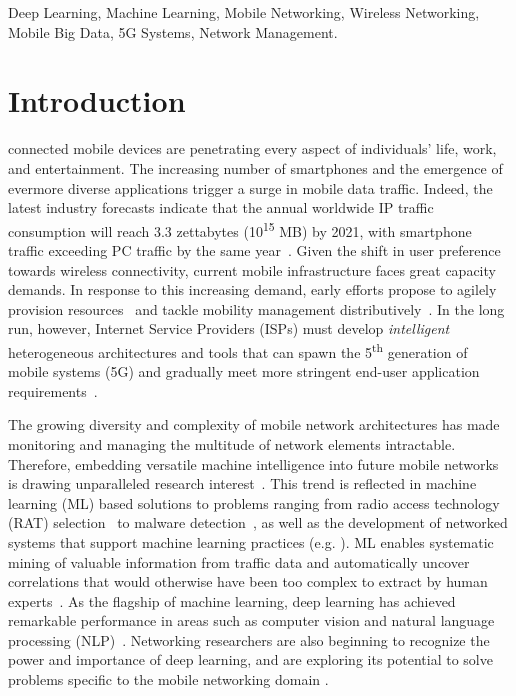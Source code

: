\documentclass[journal,comsoc,letter]{IEEEtran}
\begin{document}
\begin{IEEEkeywords}
Deep Learning, Machine Learning, Mobile Networking, Wireless Networking, Mobile Big Data, 5G Systems, Network Management.
\end{IEEEkeywords}

\IEEEpeerreviewmaketitle

\section{Introduction}
 connected mobile devices are penetrating every aspect of individuals' life, work, and entertainment. The increasing number of smartphones and the emergence of evermore diverse applications trigger a surge in mobile data traffic. Indeed, the latest industry forecasts indicate that the annual worldwide IP traffic consumption will reach 3.3 zettabytes (10\textsuperscript{15} MB) by 2021, with smartphone traffic exceeding PC traffic by the same year~\cite{cisco2017}. Given the shift in user preference towards wireless connectivity, current mobile infrastructure faces great capacity demands. In response to this increasing demand, early efforts propose to agilely provision resources~\cite{wang2015backhauling} and tackle mobility management distributively~\cite{giust2015distributed}. In the long run, however, Internet Service Providers (ISPs) must develop \emph{intelligent} heterogeneous architectures and tools that can spawn the 5\textsuperscript{th} generation of mobile systems (5G) and gradually meet more stringent end-user application requirements~\cite{agiwal2016next, gupta2015survey}. 

The growing diversity and complexity of mobile network architectures has made monitoring and managing the multitude of network elements intractable. Therefore, embedding versatile machine intelligence into future mobile networks is drawing unparalleled research interest~\cite{zheng2016big, jiang2017machine}. This trend is reflected in machine learning (ML) based solutions to problems ranging from radio access technology (RAT) selection~\cite{nguyen2017reinforcement} to malware detection~\cite{narudin2016evaluation}, as well as the development of networked systems that support machine learning practices (e.g. \cite{hsieh2017gaia, xiao2017tux2}). ML enables systematic mining of valuable information from traffic data and automatically uncover correlations that would otherwise have been too complex to extract by human experts~\cite{anareport}. As the flagship of machine learning, deep learning has achieved remarkable performance in areas  
such as computer vision \cite{zhang2015convolutional} and natural language processing (NLP)~\cite{socher2012deep}. 
Networking researchers are also beginning to recognize the power and importance of deep learning, and are exploring its potential to solve problems specific to the mobile networking domain \cite{specialissue, wang2017machine}. 
\end{document}
